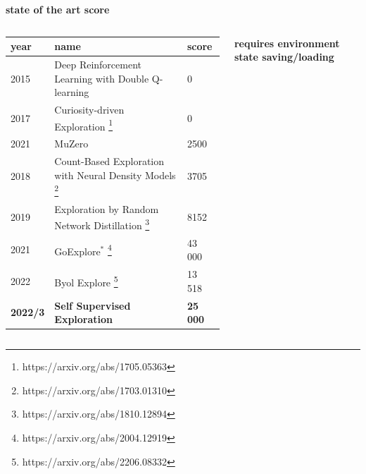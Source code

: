 \documentclass{beamer}
\begin{document}
  
  \begin{frame}{\bf state of the art score}
  
  
  \begin{columns}
      \column{\dimexpr\paperwidth-10pt}
    
  
        \begin{table}[]
        \begin{tabular}{|l|l|l|}
        \hline
        \textbf{year} & \textbf{name}                                       & \textbf{score} \\ \hline
        2015          & Deep Reinforcement Learning with Double Q-learning  & 0              \\ \hline
        2017          & Curiosity-driven Exploration  \footnote[1]{https://arxiv.org/abs/1705.05363} & 0       \\ \hline 
        2021          & MuZero                                              & 2500           \\ \hline
        2018          & Count-Based Exploration with Neural Density Models \footnote[2]{https://arxiv.org/abs/1703.01310}  & 3705           \\ \hline
        2019          & Exploration by Random Network Distillation  \footnote[3]{https://arxiv.org/abs/1810.12894}& 8152  \\ \hline
        2021          & GoExplore$^*$ \footnote[4]{https://arxiv.org/abs/2004.12919}                         & 43 000         \\ \hline
        2022          & Byol Explore \footnote[5]{https://arxiv.org/abs/2206.08332}                      & 13 518       \\ \hline
        \textbf{2022/3}        & \textbf{Self Supervised Exploration}        & \textbf{25 000}        \\ \hline
        \end{tabular}
        \end{table}
  
        {\bf * requires environment state saving/loading}
  
  \end{columns}
  
  
  \end{frame}
  
\end{document}
